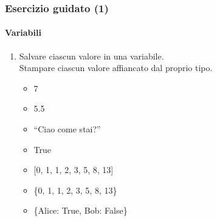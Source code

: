 \begin{exerciseframe}
    \frametitle{Esercizio guidato (1)}
    \framesubtitle{Variabili}

    \begin{enumerate}
        \item Salvare ciascun valore in una variabile.\\
    Stampare ciascun valore affiancato dal proprio tipo.
        \begin{itemize}
            \item 7\pause
            \item 5.5\pause
            \item ``Ciao come stai?''\pause
            \item True\pause
            \item{} [0, 1, 1, 2, 3, 5, 8, 13]\pause
            \item \{0, 1, 1, 2, 3, 5, 8, 13\}\pause
            \item  \{\textquotesingle{}Alice\textquotesingle{}: True, \textquotesingle{}Bob\textquotesingle{}: False\}
        \end{itemize}
    \end{enumerate}
\end{exerciseframe}

